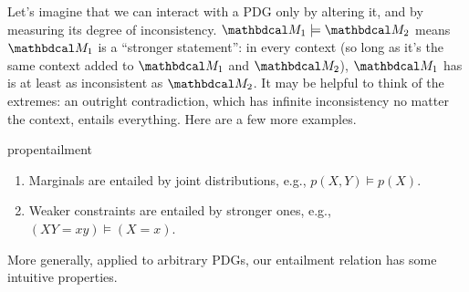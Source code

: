     Let's imagine that we can interact with a PDG only by altering it, and by measuring its degree of inconsistency.
    $\dg M_1 \models \dg M_2$ means $\dg M_1$ is a ``stronger statement'': in every context (so long as it's the same context added to $\dg M_1$ and $\dg M_2$), $\dg M_1$ has is at least as inconsistent as $\dg M_2$. 
    It may be helpful to think of the extremes: 
    an outright contradiction, which has infinite inconsistency no matter the context, entails everything.  Here are a few more examples. 
    
    
    \begin{linked}{prop}{entailment}
    \begin{enumerate}[parsep=0pt,itemsep=0.2ex]
        \item Marginals are entailed by joint distributions, e.g., $p(X,Y) \models p(X)$.
        \item Weaker constraints are entailed by stronger ones, e.g., $(XY {=}xy) \models (X{=}x)$. 
    \end{enumerate}   
    \end{linked}
    
    More generally, applied to arbitrary PDGs, our entailment relation has some intuitive properties. 
    
